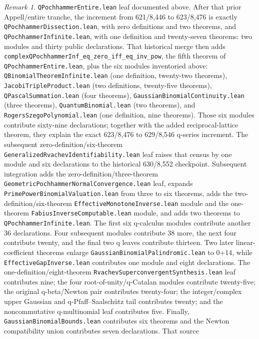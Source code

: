 \documentclass[11pt,oneside]{article}
\theoremstyle{definition}
\theoremstyle{remark}
\newtheorem{remark}[theorem]{Remark}
\begin{document}
\begin{remark}
\nolinkurl{QPochhammerEntire.lean} leaf documented above.  After that prior
Appell/entire tranche, the increment from 621/8,446 to 623/8,476 is exactly
\nolinkurl{QPochhammerDissection.lean}, with zero definitions and two theorems,
and \nolinkurl{QPochhammerInfinite.lean}, with one definition and twenty-seven
theorems: two modules and thirty public declarations.  That historical merge then
adds \nolinkurl{complexQPochhammerInf_eq_zero_iff_eq_inv_pow}, the fifth theorem
of \nolinkurl{QPochhammerEntire.lean}, plus the six modules inventoried above:
\nolinkurl{QBinomialTheoremInfinite.lean} (one definition, twenty-two
theorems), \nolinkurl{JacobiTripleProduct.lean} (two definitions, twenty-five
theorems), \nolinkurl{QPascalSummation.lean} (four theorems),
\nolinkurl{GaussianBinomialContinuity.lean} (three theorems),
\nolinkurl{QuantumBinomial.lean} (two theorems), and
\nolinkurl{RogersSzegoPolynomial.lean} (one definition, nine theorems).
Those six modules contribute sixty-nine declarations; together with the added
reciprocal-lattice theorem, they explain the exact 623/8,476 to 629/8,546
q-series increment.  The subsequent zero-definition/six-theorem
\nolinkurl{GeneralizedRvachevIdentifiability.lean} leaf raises that census by
one module and six declarations to the historical 630/8,552 checkpoint.
Subsequent integration adds the zero-definition/three-theorem
\nolinkurl{GeometricPochhammerNormalConvergence.lean} leaf, expands
\nolinkurl{PrimePowerBinomialValuation.lean} from three to six theorems, adds
the two-definition/six-theorem \nolinkurl{EffectiveMonotoneInverse.lean}
module and the one-theorem \nolinkurl{FabiusInverseComputable.lean} module,
and adds two theorems to \nolinkurl{QPochhammerInfinite.lean}.  The first six
q-calculus modules contribute another 36 declarations.  Four subsequent
modules contribute 38 more, the next four contribute twenty, and the final two
q leaves contribute thirteen.  Two later linear-coefficient theorems enlarge
\nolinkurl{GaussianBinomialPalindromic.lean} to 0+14, while
\nolinkurl{EffectiveGapInverse.lean} contributes one module and eight
declarations.  The one-definition/eight-theorem
\nolinkurl{RvachevSuperconvergentSynthesis.lean} leaf contributes nine;
the four root-of-unity/q-Catalan modules contribute twenty-five; the original
q-beta/Newton pair contributes twenty-four; the integer/complex upper Gaussian
and q-Pfaff--Saalsch\"utz tail contributes twenty; and the noncommutative
q-multinomial leaf contributes five.  Finally,
\nolinkurl{GaussianBinomialBounds.lean} contributes six theorems and the
Newton compatibility union contributes seven declarations.  That source

\end{remark}
\end{document}
